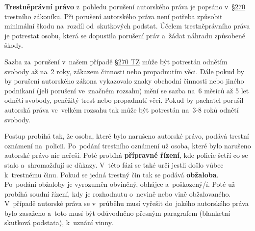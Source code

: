 \textbf{Trestněprávní právo} z~pohledu porušení autorského práva je popsáno v~\href{https://www.zakonyprolidi.cz/cs/2009-40#p270}{§270} trestního zákoníku. Při porušení autorského práva není potřeba způsobit minimální škodu na~rozdíl od~skutkových podstat. Účelem trestněprávního práva je potrestat osobu, která se dopustila porušení práv a~žádat náhradu způsobené škody.

Sazba za~porušení v~našem případě \href{https://www.zakonyprolidi.cz/cs/2009-40#p270}{§270 TZ} může být potrestán odnětím svobody až na~2 roky, zákazem činnosti nebo propadnutím věci. Dále pokud by by porušení autorského zákona vykazovalo znaky obchodní činnosti nebo jiného podnikaní (jeli porušení ve~značném rozsahu) mění se sazba na~6 měsíců až 5 let odnětí svobody, peněžitý trest nebo propadnutí věci. Pokud by pachatel porušil autorská práva ve~velkém rozsahu tak může být potrestán na~3-8 roků odnětí svobody.


Postup probíhá tak, že osoba, které bylo narušeno autorské právo, podává trestní oznámení na~policii. Po~podání trestního oznámení už osoba, které bylo narušeno autorské právo nic neřeší. Poté probíhá \textbf{přípravné řízení}, kde policie šetří co se stalo a~shromažďují se důkazy. V~této fázi se také určí jestli došlo vůbec k~trestnému činu. Pokud se jedná trestný čin tak se podává \textbf{obžaloba}. Po~podání obžaloby je vyrozuměn obviněný, obhájce a~poškozený/í. Poté už probíhá soudní řízení, kdy je rozhodnutu o~nevině nebo vině obžalovaného. V~případě autorské práva se v~průběhu musí vyřešit do~jakého autorského práva bylo zasaženo a~toto musí být odůvodněno přesným paragrafem (blanketní skutková podstata), k~uznání vinny.